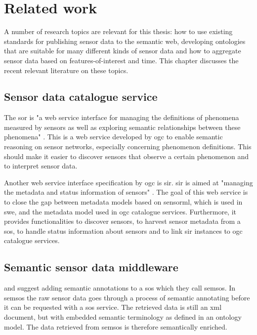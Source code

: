 \section{Related work}
\label{chap:rw}
A number of research topics are relevant for this thesis: how to use existing standards for publishing sensor data to the semantic web, developing ontologies that are suitable for many different kinds of sensor data and how to aggregate sensor data based on features-of-interest and time. This chapter discusses the recent relevant literature on these topics.     

\subsection{Sensor data catalogue service}
The \ac{sor} is "a web service interface for managing the definitions of phenomena measured by sensors as well as exploring semantic relationships between these phenomena" \cite[p. vi]{SW:OGC4}. This is a web service developed by \ac{ogc} to enable semantic reasoning on sensor networks, especially concerning phenomenon definitions. This should make it easier to discover sensors that observe a certain phenomenon and to interpret sensor data.

Another web service interface specification by \ac{ogc} is \ac{sir}. \ac{sir} is aimed at "managing the metadata and status information of sensors" \cite[p. xii]{SW:OGC3}. The goal of this web service is to close the gap between metadata models based on \ac{sensorml}, which is used in \ac{swe}, and the metadata model used in \ac{ogc} catalogue services. Furthermore, it provides functionalities to discover sensors, to harvest sensor metadata from a \ac{sos}, to handle status information about sensors and to link \ac{sir} instances to \ac{ogc} catalogue services. 

\subsection{Semantic sensor data middleware}
\cite{SSW:Henson} and \cite{SSW:Pschorr} suggest adding semantic annotations to a \ac{sos} which they call \ac{semsos}. In \ac{semsos} the raw sensor data goes through a process of semantic annotating before it can be requested with a \ac{sos} service. The retrieved data is still an \ac{xml} document, but with embedded semantic terminology as defined in an ontology model. The data retrieved from \ac{semsos} is therefore semantically enriched.  

